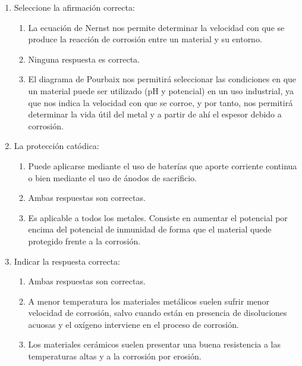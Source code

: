 \begin{enumerate}
    \item Seleccione la afirmación correcta:
          \begin{enumerate}[label=\alph*.]
              \item La ecuación de Nernst nos permite determinar la velocidad con que se produce la reacción de corrosión entre un material y su entorno.
              \item \textcolor{red!85!black}{Ninguna respuesta es correcta.}
              \item El diagrama de Pourbaix nos permitirá seleccionar las condiciones en que un material puede ser utilizado (pH y potencial) en un uso industrial, ya que nos indica la velocidad con que se corroe, y por tanto, nos permitirá determinar la vida útil del metal y a partir de ahí el espesor debido a corrosión.
          \end{enumerate}

    \item La protección catódica:
          \begin{enumerate}[label=\alph*.]
              \item \textcolor{red!85!black}{Puede aplicarse mediante el uso de baterías que aporte corriente continua o bien mediante el uso de ánodos de sacrificio.}
              \item Ambas respuestas son correctas.
              \item Es aplicable a todos los metales. Consiste en aumentar el potencial por encima del potencial de inmunidad de forma que el material quede protegido frente a la corrosión.
          \end{enumerate}

    \item Indicar la respuesta correcta:
          \begin{enumerate}[label=\alph*.]
              \item \textcolor{red!85!black}{Ambas respuestas son correctas.}
              \item A menor temperatura los materiales metálicos suelen sufrir menor velocidad de corrosión, salvo cuando están en presencia de disoluciones acuosas y el oxígeno interviene en el proceso de corrosión.
              \item Los materiales cerámicos suelen presentar una buena resistencia a las temperaturas altas y a la corrosión por erosión.
          \end{enumerate}


\end{enumerate}

